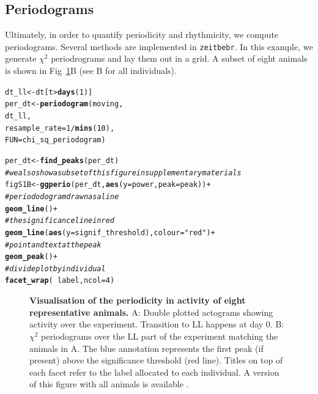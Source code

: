\documentclass[10pt,letterpaper]{article}\usepackage[]{graphicx}\usepackage[]{color}
\makeatletter
\newcommand{\hlnum}[1]{\textcolor[rgb]{0.686,0.059,0.569}{#1}}%
\newcommand{\hlstr}[1]{\textcolor[rgb]{0.192,0.494,0.8}{#1}}%
\newcommand{\hlcom}[1]{\textcolor[rgb]{0.678,0.584,0.686}{\textit{#1}}}%
\newcommand{\hlopt}[1]{\textcolor[rgb]{0,0,0}{#1}}%
\newcommand{\hlstd}[1]{\textcolor[rgb]{0.345,0.345,0.345}{#1}}%
\newcommand{\hlkwb}[1]{\textcolor[rgb]{0.69,0.353,0.396}{#1}}%
\newcommand{\hlkwc}[1]{\textcolor[rgb]{0.333,0.667,0.333}{#1}}%
\newcommand{\hlkwd}[1]{\textcolor[rgb]{0.737,0.353,0.396}{\textbf{#1}}}%
\newenvironment{kframe}{%
 \def\at@end@of@kframe{}%
 \ifinner\ifhmode%
  \def\at@end@of@kframe{\end{minipage}}%
  \begin{minipage}{\columnwidth}%
 \fi\fi%
 \def\FrameCommand##1{\hskip\@totalleftmargin \hskip-\fboxsep
 \colorbox{shadecolor}{##1}\hskip-\fboxsep
     \hskip-\linewidth \hskip-\@totalleftmargin \hskip\columnwidth}%
 \MakeFramed {\advance\hsize-\width
   \@totalleftmargin\z@ \linewidth\hsize
   \@setminipage}}%
 {\par\unskip\endMakeFramed%
 \at@end@of@kframe}
\newenvironment{knitrout}{}{} %
\makeatother
\begin{document}
\subsection*{Periodograms}
Ultimately, in order to quantify periodicity and rhythmicity, we compute periodograms.
Several methods are implemented in \texttt{zeitbebr}. In this example, we generate $\chi{}^2$ periodrograms and lay them out in a grid.
A subset of eight animals is shown in Fig~\ref{fig:fig-4}B (see B for all individuals).

\begin{knitrout}
\color{fgcolor}\begin{kframe}
\begin{alltt}
\hlstd{dt_ll} \hlkwb{<-} \hlstd{dt[t} \hlopt{>} \hlkwd{days}\hlstd{(}\hlnum{1}\hlstd{)]}
\hlstd{per_dt} \hlkwb{<-} \hlkwd{periodogram}\hlstd{(moving,}
                        \hlstd{dt_ll,}
                        \hlkwc{resample_rate} \hlstd{=} \hlnum{1}\hlopt{/}\hlkwd{mins}\hlstd{(}\hlnum{10}\hlstd{),}
                        \hlkwc{FUN}\hlstd{=chi_sq_periodogram)}

\hlstd{per_dt} \hlkwb{<-} \hlkwd{find_peaks}\hlstd{(per_dt)}
\hlcom{# we also show a subset of this figure in supplementary materials}
\hlstd{figS1B} \hlkwb{<-} \hlkwd{ggperio}\hlstd{(per_dt,} \hlkwd{aes}\hlstd{(}\hlkwc{y} \hlstd{= power,} \hlkwc{peak}\hlstd{=peak))} \hlopt{+}
                  \hlcom{# periododogram drawn as a line}
                  \hlkwd{geom_line}\hlstd{()} \hlopt{+}
                  \hlcom{# the significance line in red}
                  \hlkwd{geom_line}\hlstd{(}\hlkwd{aes}\hlstd{(}\hlkwc{y} \hlstd{= signif_threshold),} \hlkwc{colour}\hlstd{=}\hlstr{"red"}\hlstd{)} \hlopt{+}
                  \hlcom{# point and text at the peak}
                  \hlkwd{geom_peak}\hlstd{()} \hlopt{+}
                  \hlcom{# divide plot by individual}
                  \hlkwd{facet_wrap}\hlstd{(} \hlopt{~} \hlstd{label,} \hlkwc{ncol} \hlstd{=} \hlnum{4}\hlstd{)}
\end{alltt}
\end{kframe}
\end{knitrout}







\begin{figure}[!h]
	\caption{{\bf Visualisation of the periodicity in activity of eight representative animals.}
		A: Double plotted actograms showing activity over the experiment. Transition to LL happens at day 0.
		B: $\chi{}^2$ periodograms over the LL part of the experiment matching the animals in A.
		The blue annotation represents the first peak (if present) above the significance threshold (red line).
		Titles on top of each facet refer to the label allocated to each individual.
		A version of this figure with all animals is available .
	}
	\label{fig:fig-4}
\end{figure}
\end{document}
